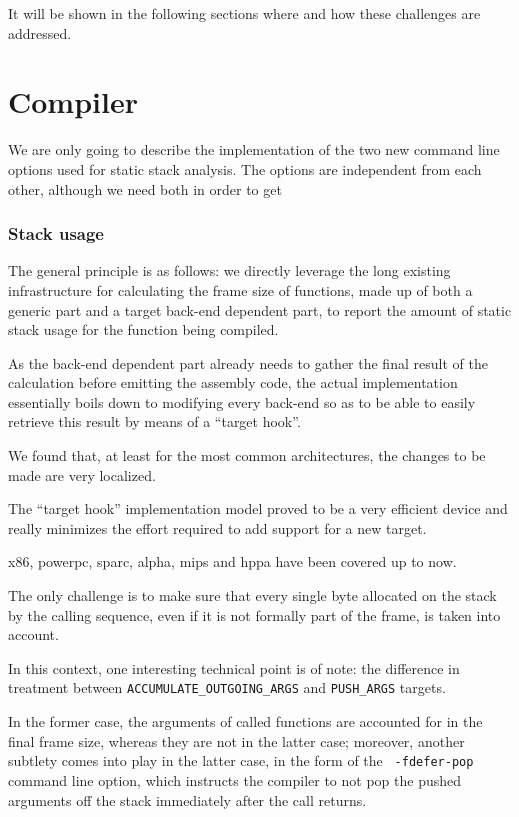 It will be shown in the following sections where and how these
challenges are addressed.

\section{Compiler}

We are only going to describe the implementation of the two new
command line options used for static stack analysis. The options are
independent from each other, although we need both in order to get 

\subsubsection{Stack usage}

The general principle is as follows: we directly leverage the long existing
infrastructure for calculating the frame size of functions, made up of both
a generic part and a target back-end dependent part, to report the amount of
static stack usage for the function being compiled.

As the back-end dependent part already needs to gather the final result of
the calculation before emitting the assembly code, the actual implementation
essentially boils down to modifying every back-end so as to be able to easily
retrieve this result by means of a ``target hook''.

We found that, at least for the most common architectures, the changes to
be made are very localized.

The ``target hook'' implementation model proved to be a very efficient device
and really minimizes the effort required to add support for a new target.

x86, powerpc, sparc, alpha, mips and hppa have been covered up to now.

The only challenge is to make sure that every single byte allocated on the
stack by the calling sequence, even if it is not formally part of the frame,
is taken into account.

In this context, one interesting technical point is of note: the difference in
treatment between \verb|ACCUMULATE_OUTGOING_ARGS| and \verb|PUSH_ARGS|
targets.

In the former case, the arguments of called functions are accounted for in the
final frame size, whereas they are not in the latter case; moreover, another
subtlety comes into play in the latter case, in the form of the {\tt
-fdefer-pop} command line option, which instructs the compiler to not pop the
pushed arguments off the stack immediately after the call returns.

